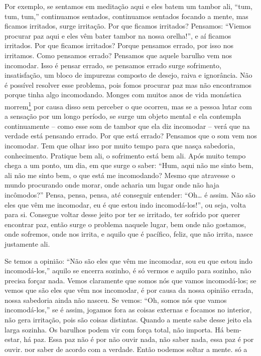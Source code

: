 Por exemplo, se sentamos em meditação aqui e eles batem um tambor
ali, “tum, tum, tum,” continuamos sentados, continuamos sentados
focando a mente, mas ficamos irritados, surge irritação. Por que
ficamos irritados? Pensamos: “Viemos procurar paz aqui e eles vêm bater
tambor na nossa orelha!”, e aí ficamos irritados. Por que ficamos
irritados? Porque pensamos errado, por isso nos irritamos. Como
pensamos errado? Pensamos que aquele barulho vem nos incomodar. Isso é
pensar errado, se pensamos errado surge sofrimento, insatisfação, um
bloco de impurezas composto de desejo, raiva e ignorância. Não é
possível resolver esse problema, pois fomos procurar paz mas não
encontramos porque tinha algo incomodando. Monges com muitos anos de
vida monástica morrem\footnote{Significa que aquele monge abandonou a
vida monástica. O Buda dizia que deixar a vida monástica é como a morte
para um monge, e daí surgiu essa expressão entre os monges.} por causa
disso sem perceber o que ocorreu, mas se a pessoa lutar com a sensação
por um longo período, se surge um objeto mental e ela contempla
continuamente – como esse som de tambor que ela diz incomodar – verá
que na verdade está pensando errado. Por que está errado? Pensamos que
o som vem nos incomodar. Tem que olhar isso por muito tempo para que
nasça sabedoria, conhecimento. Pratique bem ali, o sofrimento está bem
ali. Após muito tempo chega a um ponto, um dia, em que surge o saber:
“Hum, aqui não me sinto bem, ali não me sinto bem, o que está me
incomodando? Mesmo que atravesse o mundo procurando onde morar, onde
acharia um lugar onde não haja incômodos?” Pensa, pensa, pensa, até
conseguir entender: “Oh\ldots{} é assim. Não são eles que vêm me incomodar, eu
é que estou indo incomodá-los!”, ou seja, volta para si. Consegue
voltar desse jeito por ter se irritado, ter sofrido por querer
encontrar paz, então surge o problema naquele lugar, bem onde não
gostamos, onde sofremos, onde nos irrita, e aquilo que é pacífico,
feliz, que não irrita, nasce justamente ali. 

Se temos a opinião: “Não são eles que vêm me incomodar, sou eu que
estou indo incomodá-los,” aquilo se encerra sozinho, é só vermos e
aquilo para sozinho, não precisa forçar nada. Vemos claramente que
somos nós que vamos incomodá-los; se vemos que são eles que vêm nos
incomodar, é por causa da nossa opinião errada, nossa sabedoria ainda
não nasceu. Se vemos: “Oh, somos nós que vamos incomodá-los,” se é
assim, jogamos fora as coisas externas e focamos no interior, não gera
irritação, pois são coisas distintas. Quando a mente sabe desse jeito
ela larga sozinha. Os barulhos podem vir com força total, não importa.
Há bem-estar, há paz. Essa paz não é por não ouvir nada, não saber
nada, essa paz é por ouvir, por saber de acordo com a verdade. Então
podemos soltar a mente, só a utilizamos quando necessário. Mas se
estamos em grupo, viemos procurar paz aqui, os monges estão aqui em
paz, as pessoas não podem vir fazer algazarra aqui. Temos que dizer:
“Pare! Não trabalhe aqui, não fale alto aqui, não venha cantar aqui.”
Temos que usar o método mundano, pois, se deixarmos, eles vão ficar
bagunçando, não gera benefício algum. 

